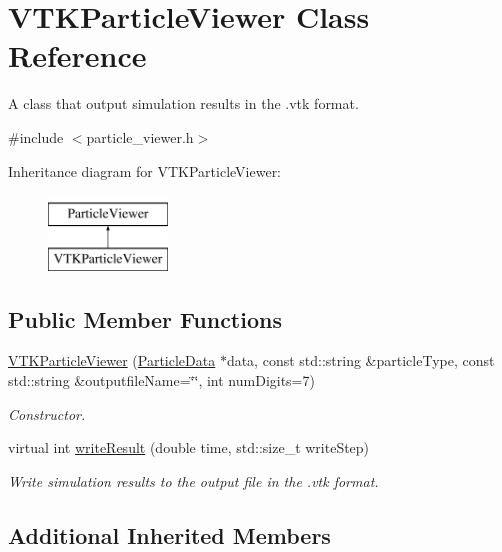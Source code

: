 \hypertarget{classVTKParticleViewer}{\section{V\-T\-K\-Particle\-Viewer Class Reference}
\label{classVTKParticleViewer}
}


A class that output simulation results in the .vtk format.  




{\ttfamily \#include $<$particle\-\_\-viewer.\-h$>$}

Inheritance diagram for V\-T\-K\-Particle\-Viewer\-:\begin{figure}[H]
\begin{center}
\leavevmode
\includegraphics[height=2.000000cm]{classVTKParticleViewer}
\end{center}
\end{figure}
\subsection*{Public Member Functions}
\begin{DoxyCompactItemize}
\item 
\hyperlink{classVTKParticleViewer_a3b3f367478a14d3f849e515e84cd48fb}{V\-T\-K\-Particle\-Viewer} (\hyperlink{classParticleData}{Particle\-Data} $\ast$data, const std\-::string \&particle\-Type, const std\-::string \&outputfile\-Name=\char`\"{}\char`\"{}, int num\-Digits=7)
\begin{DoxyCompactList}\small\item\em Constructor. \end{DoxyCompactList}\item 
virtual int \hyperlink{classVTKParticleViewer_a45efc6692f3d8d7178f456cfb7779c88}{write\-Result} (double time, std\-::size\-\_\-t write\-Step)
\begin{DoxyCompactList}\small\item\em Write simulation results to the output file in the .vtk format. \end{DoxyCompactList}\end{DoxyCompactItemize}
\subsection*{Additional Inherited Members}


